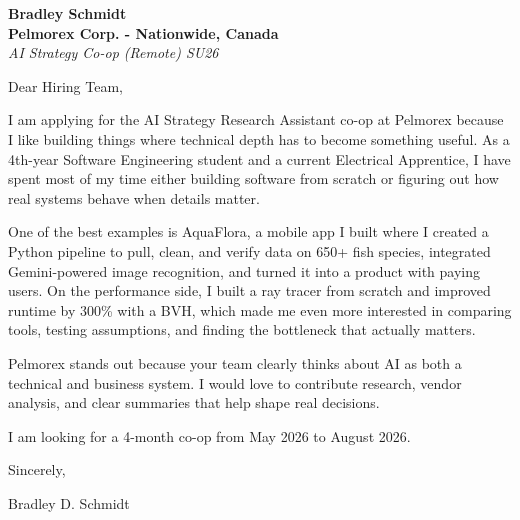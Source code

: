 \documentclass[11pt]{article}
\begin{document}
\textbf{Bradley Schmidt}\\
\vspace{0.5em}
\textbf{Pelmorex Corp. - Nationwide, Canada}\\
\textit{AI Strategy Co-op (Remote) SU26}

Dear Hiring Team,

\par

I am applying for the AI Strategy Research Assistant co-op at Pelmorex because I like building things where technical depth has to become something useful. As a 4th-year Software Engineering student and a current Electrical Apprentice, I have spent most of my time either building software from scratch or figuring out how real systems behave when details matter.

\par

One of the best examples is AquaFlora, a mobile app I built where I created a Python pipeline to pull, clean, and verify data on 650+ fish species, integrated Gemini-powered image recognition, and turned it into a product with paying users. On the performance side, I built a ray tracer from scratch and improved runtime by 300\% with a BVH, which made me even more interested in comparing tools, testing assumptions, and finding the bottleneck that actually matters.

\par

Pelmorex stands out because your team clearly thinks about AI as both a technical and business system. I would love to contribute research, vendor analysis, and clear summaries that help shape real decisions.

\par

I am looking for a 4-month co-op from May 2026 to August 2026.

\par

Sincerely,

\par

Bradley D. Schmidt
\end{document}
